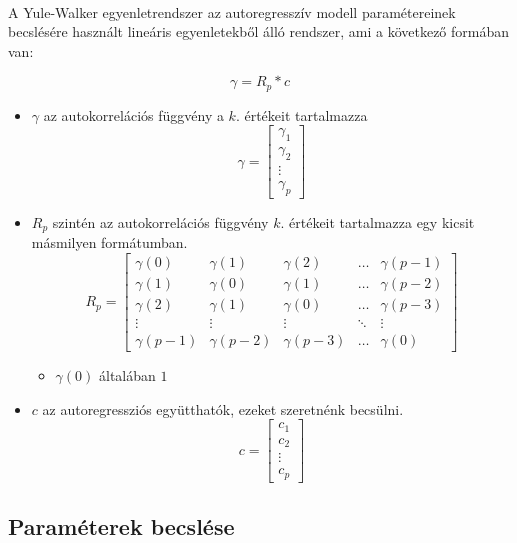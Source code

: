 \documentclass[11pt,a4pape,draftr]{article}
\begin{document}
					\paragraph{}
						A Yule-Walker egyenletrendszer az autoregresszív modell paramétereinek becslésére használt lineáris egyenletekből álló rendszer, ami a következő formában van:
						
						$$\gamma = R_p * c$$
						
						\begin{itemize}
						\item $\gamma$ az autokorrelációs függvény a $k.$ értékeit tartalmazza
							$$\gamma = \left[ \begin{array}{c}
							\gamma_1 \\ \gamma_2 \\ \vdots \\ \gamma_p
							\end{array}\right]$$
						\item $R_p$ szintén az autokorrelációs függvény $k.$ értékeit tartalmazza egy kicsit másmilyen formátumban.
							$$R_p = \left[\begin{array}{cccccc}
							\gamma(0) & \gamma(1) & \gamma(2) & \dots & \gamma(p-1) \\
							\gamma(1) & \gamma(0) & \gamma(1) & \dots & \gamma(p-2) \\
							\gamma(2) & \gamma(1) & \gamma(0) & \dots & \gamma(p-3) \\
							\vdots & \vdots & \vdots & \ddots & \vdots \\
							\gamma(p-1) & \gamma(p-2) & \gamma(p-3) & \dots & \gamma(0)
							\end{array}\right]$$
						\begin{itemize}
							\item $\gamma(0)$ általában $1$
						\end{itemize}
						\item $c$ az autoregressziós együtthatók, ezeket szeretnénk becsülni.
							$$c = \left[\begin{array}{c}
							c_1 \\ c_2 \\ \vdots \\ c_p
							\end{array}\right]$$
						\end{itemize}
				\subsection{Paraméterek becslése}
\end{document}
